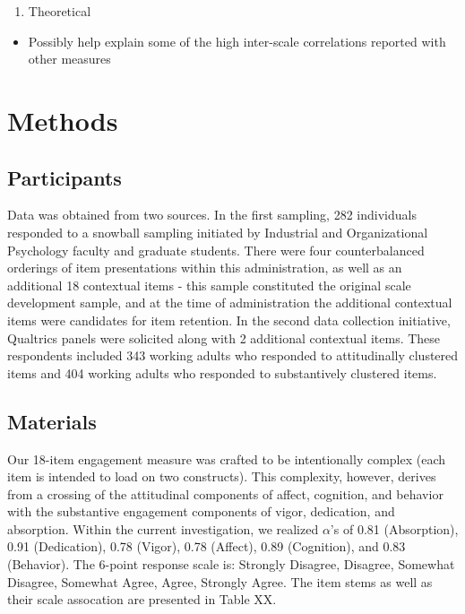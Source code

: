 \documentclass[
  man]{apa6}
\providecommand{\tightlist}{%
  \setlength{\itemsep}{0pt}\setlength{\parskip}{0pt}}
\begin{document}
\begin{enumerate}
\def\labelenumi{\arabic{enumi}.}
\setcounter{enumi}{2}
\tightlist
\item
  Theoretical
\end{enumerate}

\begin{itemize}
\tightlist
\item
  Possibly help explain some of the high inter-scale correlations reported with other measures
\end{itemize}

\hypertarget{methods}{%
\section{Methods}\label{methods}}

\hypertarget{participants}{%
\subsection{Participants}\label{participants}}

Data was obtained from two sources. In the first sampling, 282 individuals responded to a snowball sampling initiated by Industrial and Organizational Psychology faculty and graduate students. There were four counterbalanced orderings of item presentations within this administration, as well as an additional 18 contextual items - this sample constituted the original scale development sample, and at the time of administration the additional contextual items were candidates for item retention. In the second data collection initiative, Qualtrics panels were solicited along with 2 additional contextual items. These respondents included 343 working adults who responded to attitudinally clustered items and 404 working adults who responded to substantively clustered items.

\hypertarget{materials}{%
\subsection{Materials}\label{materials}}

Our 18-item engagement measure was crafted to be intentionally complex (each item is intended to load on two constructs). This complexity, however, derives from a crossing of the attitudinal components of affect, cognition, and behavior with the substantive engagement components of vigor, dedication, and absorption. Within the current investigation, we realized \(\alpha\)'s of 0.81 (Absorption), 0.91 (Dedication), 0.78 (Vigor), 0.78 (Affect), 0.89 (Cognition), and 0.83 (Behavior). The 6-point response scale is: Strongly Disagree, Disagree, Somewhat Disagree, Somewhat Agree, Agree, Strongly Agree. The item stems as well as their scale assocation are presented in Table XX.
\end{document}
